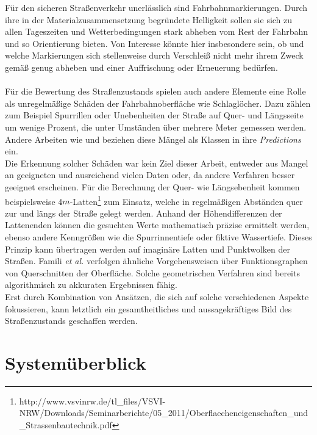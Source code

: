 Für den sicheren Straßenverkehr unerlässlich sind Fahrbahnmarkierungen. Durch ihre in der Materialzusammensetzung begründete Helligkeit sollen sie sich zu allen Tageszeiten und Wetterbedingungen stark abheben vom Rest der Fahrbahn und so Orientierung bieten. Von Interesse könnte hier insbesondere sein, ob und welche Markierungen sich stellenweise durch Verschleiß nicht mehr ihrem Zweck gemäß genug abheben und einer Auffrischung oder Erneuerung bedürfen. \\\\
Für die Bewertung des Straßenzustands spielen auch andere Elemente eine Rolle als unregelmäßige Schäden der Fahrbahnoberfläche wie Schlaglöcher. Dazu zählen zum Beispiel Spurrillen oder Unebenheiten der Straße auf Quer- und Längsseite um wenige Prozent, die unter Umständen über mehrere Meter gemessen werden. Andere Arbeiten wie \cite{Zhiqiang.etal-2019} und \cite{Famili.etal-2021} beziehen diese Mängel als Klassen in ihre \textit{Predictions} ein. \\
Die Erkennung solcher Schäden war kein Ziel dieser Arbeit, entweder aus Mangel an geeigneten und ausreichend vielen Daten oder, da andere Verfahren besser geeignet erscheinen. Für die Berechnung der Quer- wie Längsebenheit kommen beispielsweise 4$m$-Latten\footnote{http://www.vsvinrw.de/tl\_files/VSVI-NRW/Downloads/Seminarberichte/05\_2011/Oberflaecheneigenschaften\_und\_Strassenbautechnik.pdf} zum Einsatz, welche in regelmäßigen Abständen quer zur und längs der Straße gelegt werden. Anhand der Höhendifferenzen der Lattenenden können die gesuchten Werte mathematisch präzise ermittelt werden, ebenso andere Kenngrößen wie die Spurrinnentiefe oder fiktive Wassertiefe. Dieses Prinzip kann übertragen werden auf imaginäre Latten und Punktwolken der Straßen. Famili \textit{et al.} \cite{Famili.etal-2021} verfolgen ähnliche Vorgehensweisen über Funktionsgraphen von Querschnitten der Oberfläche. Solche geometrischen Verfahren sind bereits algorithmisch zu akkuraten Ergebnissen fähig. \\
Erst durch Kombination von Ansätzen, die sich auf solche verschiedenen Aspekte fokussieren, kann letztlich ein gesamtheitliches und aussagekräftiges Bild des Straßenzustands geschaffen werden. 

\section{Systemüberblick}

